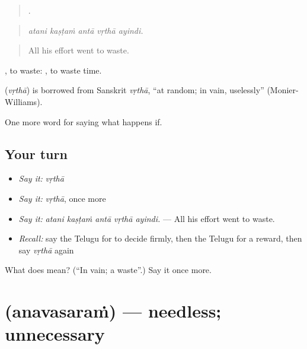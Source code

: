 \begin{quote}
    .
\end{quote}

\begin{quote}
\emph{atani kaṣṭaṁ antā vṛthā ayindi.}
\end{quote}

\begin{quote}
All his effort went to waste.
\end{quote}

 , to waste:   , to waste time.

\begin{cousinweb}
\textbf{} (\emph{vṛthā}) is borrowed from Sanskrit \emph{vṛthā}, \textquotedblleft{}at random; in vain, uselessly\textquotedblright{} (Monier-Williams).
\end{cousinweb}

\begin{grammarlens}[title={What you've built}]
One more word for saying what happens if.
\end{grammarlens}

\subsection*{Your turn}
\begin{itemize}
\raggedright
  \item \emph{Say it:} \emph{vṛthā}
  \item \emph{Say it:} \emph{vṛthā}, once more
  \item \emph{Say it:} \emph{atani kaṣṭaṁ antā vṛthā ayindi.} — All his effort went to waste.
  \item \emph{Recall:} say the Telugu for to decide firmly, then the Telugu for a reward, then say \emph{vṛthā} again
\end{itemize}

\begin{tcolorbox}[breakable,colback=teal!4,colframe=teal!35!black,title={Before you move on}]
What does  mean? (\textquotedblleft{}In vain; a waste\textquotedblright{}.) Say it once more.
\end{tcolorbox}
\section[\texorpdfstring{\te{అనవసరం} (anavasaraṁ)}{అనవసరం (anavasaraṁ)}]{ (anavasaraṁ) — needless; unnecessary}

